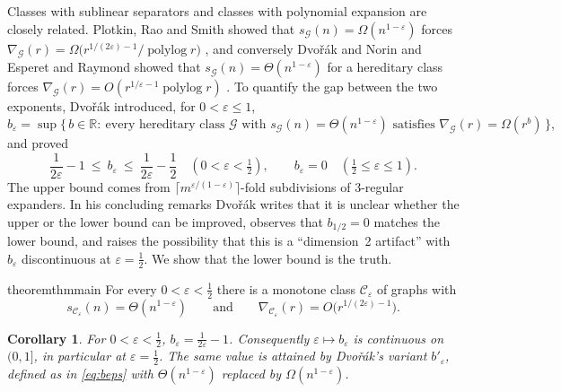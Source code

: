 \documentclass[11pt,a4paper]{article}
\theoremstyle{plain}
\newtheorem{corollary}[theorem]{Corollary}
\theoremstyle{definition}
\theoremstyle{remark}
\newcommand{\polylog}{\operatorname{polylog}}
\newcommand{\cC}{\mathcal C}
\newcommand{\cG}{\mathcal G}
\newcommand{\R}{\mathbb R}
\begin{document}
Classes with sublinear separators and classes with polynomial expansion are closely related. Plotkin, Rao and Smith \cite{PRS94} showed that $s_{\cG}(n)=\Omega(n^{1-\varepsilon})$ forces $\nabla_{\cG}(r)=\Omega\bigl(r^{1/(2\varepsilon)-1}/\polylog r\bigr)$ \cite[Corollary~2]{Dvorak20}, and conversely Dvořák and Norin \cite{DN16} and Esperet and Raymond \cite{ER18} showed that $s_{\cG}(n)=\Theta(n^{1-\varepsilon})$ for a hereditary class forces $\nabla_{\cG}(r)=O(r^{1/\varepsilon-1}\polylog r)$ \cite[Theorem~5]{Dvorak20}. To quantify the gap between the two exponents, Dvořák introduced, for $0<\varepsilon\le1$,
\begin{equation}\label{eq:beps}
 b_\varepsilon=\sup\bigl\{\,b\in\R:\ \text{every hereditary class }\cG\text{ with }s_{\cG}(n)=\Theta(n^{1-\varepsilon})\text{ satisfies }\nabla_{\cG}(r)=\Omega(r^{b})\,\bigr\},
\end{equation}
and proved \cite[Corollary~6, Lemmas~10 and~12]{Dvorak20}
\begin{equation}\label{eq:dvorak}
 \frac1{2\varepsilon}-1\ \le\ b_\varepsilon\ \le\ \frac1{2\varepsilon}-\frac12\quad(0<\varepsilon<\tfrac12),\qquad b_\varepsilon=0\quad(\tfrac12\le\varepsilon\le1).
\end{equation}
The upper bound comes from $\lceil m^{\varepsilon/(1-\varepsilon)}\rceil$-fold subdivisions of $3$-regular expanders. In his concluding remarks Dvořák writes that it is unclear whether the upper or the lower bound can be improved, observes that $b_{1/2}=0$ matches the lower bound, and raises the possibility that this is a ``dimension~2 artifact'' with $b_\varepsilon$ discontinuous at $\varepsilon=\frac12$. We show that the lower bound is the truth.

\begin{restatable}{theorem}{thmmain}\label{thm:main}
For every $0<\varepsilon<\frac12$ there is a monotone class $\cC_\varepsilon$ of graphs with
\[
 s_{\cC_\varepsilon}(n)=\Theta(n^{1-\varepsilon})\qquad\text{and}\qquad \nabla_{\cC_\varepsilon}(r)=O\bigl(r^{1/(2\varepsilon)-1}\bigr).
\]
\end{restatable}

\begin{corollary}\label{cor:beps}
For $0<\varepsilon<\frac12$, $b_\varepsilon=\frac1{2\varepsilon}-1$. Consequently $\varepsilon\mapsto b_\varepsilon$ is continuous on $(0,1]$, in particular at $\varepsilon=\frac12$. The same value is attained by Dvořák's variant $b'_\varepsilon$, defined as in \eqref{eq:beps} with $\Theta(n^{1-\varepsilon})$ replaced by $\Omega(n^{1-\varepsilon})$.
\end{corollary}
\end{document}
